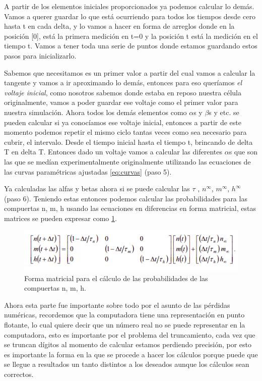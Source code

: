 A partir de los elementos iniciales proporcionados ya podemos calcular lo demás. Vamos a querer guardar lo que está ocurriendo para todos los tiempos desde cero hasta t en cada delta, y lo vamos a hacer en forma de arreglos donde en la posición [0], está la primera medición en t=0 y la posición t está la medición en el tiempo t. Vamos a tener toda una serie de puntos donde estamos guardando estos pasos para inicializarlo. 

Sabemos que necesitamos es un primer valor a partir del cual vamos a calcular la tangente y vamos a ir aproximando lo demás, entonces para eso queríamos \emph{el voltaje inicial}, como nosotros sabemos donde estaba en reposo nuestra célula originalmente, vamos a poder guardar ese voltaje como el primer valor para nuestra simulación. Ahora todos los demás elementos como $\alpha$s y $\beta$s y etc. se pueden calcular si ya conocíamos ese voltaje inicial, entonces a partir de este momento podemos repetir el mismo ciclo tantas veces como sea necesario para cubrir, el intervalo. 
Desde el tiempo inicial hasta el tiempo t, brincando de delta T en delta T. 
Entonces dado un voltaje vamos a calcular las diferentes \(\alpha\)s que son las que se medían experimentalmente originalmente utilizando las ecuaciones  de las curvas paramétricas ajustadas \ref{eq:curvas} (paso 5).

Ya calculadas las alfas y betas ahora si se puede calcular las $\tau$ , $n^{\infty}$, $m^{\infty}$, $h^{\infty}$ (paso 6).
Teniendo estas entonces podemos calcular las probabilidades para las compuertas n, m, h usando las ecuaciones en diferencias en forma matricial, estas matrices se pueden expresar como \ref{fig:matriX}.

\begin{figure}[H]
 \centering
 \includegraphics[scale=0.7]{../Figuras/matrix.png}
 \caption{Forma matricial para el cálculo de las probabilidades de las compuertas n, m, h.}
 \label{fig:matriX}
\end{figure}

Ahora esta parte fue importante sobre todo por el asunto de las pérdidas numéricas, recordemos que la computadora tiene una representación en punto flotante, lo cual quiere decir que un número real no se puede representar en la computadora, esto es importante por el problema del truncamiento, cada vez que se truncan dígitos al momento de calcular estamos perdiendo precisión, por esto es importante la forma en la que se procede a hacer los cálculos porque puede que se llegue a resultados un tanto distintos a los deseados aunque los cálculos sean correctos. 

